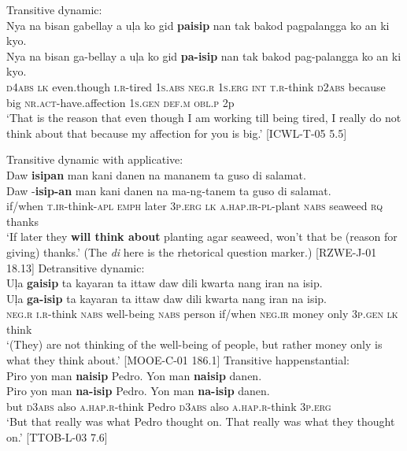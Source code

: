 \ea
Transitive dynamic: \\
Nya  na  bisan  gabellay  a  uļa  ko  gid  \textbf{paisip}  nan tak  bakod  pagpalangga  ko  an  ki  kyo. \\\smallskip
\gll Nya  na  bisan  ga-bellay  a  uļa  ko  gid  \textbf{pa-isip}  nan tak  bakod  pag-palangga  ko  an  ki  kyo. \\
\textsc{d4abs}  \textsc{lk}  even.though  \textsc{i.r}-tired  1\textsc{s.abs}  \textsc{neg.r}  1\textsc{s.erg}  \textsc{int}  \textsc{t.r}-think  \textsc{d2abs}
because  big  \textsc{nr.act}-have.affection  1\textsc{s.gen}  \textsc{def.m}  \textsc{obl.p}  2p \\
\glt `That is the reason that even though I am working till being tired, I really do not think about that because my affection for you is big.’ [ICWL-T-05 5.5]
\z

\ea
Transitive dynamic with applicative: \\
Daw  \textbf{isipan}  man  kani  danen  na  mananem  ta guso di  salamat.\\\smallskip
\gll Daw  \emptyset{}-\textbf{isip-an}  man  kani  danen  na  ma-ng-tanem  ta guso di  salamat.\\
if/when  \textsc{t.ir}-think-\textsc{apl}  \textsc{emph}  later  3\textsc{p.erg}  \textsc{lk}  \textsc{a.hap.ir}-\textsc{pl}-plant  \textsc{nabs}  seaweed \textsc{rq}  thanks \\
\glt `If later they \textbf{will think about} planting agar seaweed, won’t that be (reason for giving) thanks.’ (The \textit{di} here is the rhetorical question marker.) [RZWE-J-01 18.13]
\z
\ea
Detransitive dynamic: \\
Uļa  \textbf{gaisip}  ta  kayaran  ta  ittaw  daw  dili   kwarta  nang  iran  na  isip. \\\smallskip
\gll Uļa  \textbf{ga-isip}  ta  kayaran  ta  ittaw  daw  dili   kwarta  nang  iran  na  isip. \\
\textsc{neg.r}  \textsc{i.r}-think  \textsc{nabs}  well-being  \textsc{nabs}  person  if/when  \textsc{neg.ir} money  only  3\textsc{p.gen}  \textsc{lk}  think \\
\glt `(They) are not thinking of the well-being of people, but rather money only is what they think about.’ [MOOE-C-01 186.1]
\z
\ea
Transitive happenstantial: \\
Piro  yon  man  \textbf{naisip}  Pedro.  Yon  man  \textbf{naisip}  danen. \\\smallskip
\gll Piro  yon  man  \textbf{na-isip}  Pedro.  Yon  man  \textbf{na-isip}  danen. \\
but  \textsc{d3abs}  also  \textsc{a.hap.r}-think  Pedro  \textsc{d3abs}  also  \textsc{a.hap.r}-think  3\textsc{p.erg} \\
\glt ‘But that really was what Pedro thought on. That really was what they thought on.’ [TTOB-L-03 7.6]
\z

